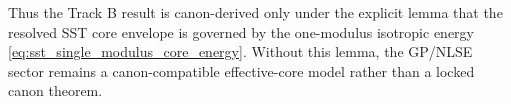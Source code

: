Thus the Track B result is canon-derived only under the explicit lemma that the
resolved SST core envelope is governed by the one-modulus isotropic energy
\eqref{eq:sst_single_modulus_core_energy}.  Without this lemma, the GP/NLSE
sector remains a canon-compatible effective-core model rather than a locked
canon theorem.
